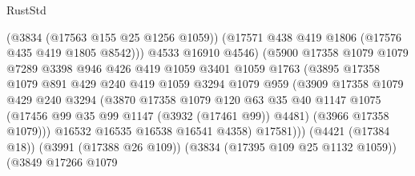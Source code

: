 \begin{lexlean}{RustStd}
\begin{coremodule}
                                    (@3834 (@17563 @155 @25 @1256 @1059))
                                    (@17571 @438 @419 @1806 (@17576 @435 @419 @1805 @8542)))
                                  @4533
                                  @16910
                                  @4546)
                                (@5900
                                  @17358
                                  @1079
                                  @1079
                                  @7289
                                  @3398
                                  @946
                                  @426
                                  @419
                                  @1059
                                  @3401
                                  @1059
                                  @1763
                                  (@3895
                                    @17358
                                    @1079
                                    @891
                                    @429
                                    @240
                                    @419
                                    @1059
                                    @3294
                                    @1079
                                    @959
                                    (@3909
                                      @17358
                                      @1079
                                      @429
                                      @240
                                      @3294
                                      (@3870
                                        @17358
                                        @1079
                                        @120
                                        @63
                                        @35
                                        @40
                                        @1147
                                        @1075
                                        (@17456 @99 @35 @99 @1147 (@3932 (@17461 @99)) @4481)
                                        (@3966 @17358 @1079)))
                                    @16532
                                    @16535
                                    @16538
                                    @16541
                                    @4358)
                                  @17581)))
                            (@4421 (@17384 @18))
                            (@3991 (@17388 @26 @109))
                            (@3834 (@17395 @109 @25 @1132 @1059))
                            (@3849
                              @17266
                              @1079

\end{coremodule}
\end{lexlean}
